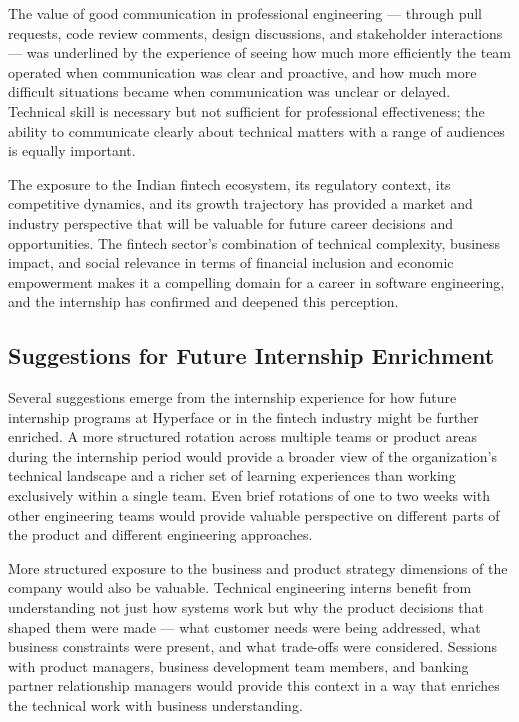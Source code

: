 The value of good communication in professional engineering — through pull requests, code review comments, design discussions, and stakeholder interactions — was underlined by the experience of seeing how much more efficiently the team operated when communication was clear and proactive, and how much more difficult situations became when communication was unclear or delayed. Technical skill is necessary but not sufficient for professional effectiveness; the ability to communicate clearly about technical matters with a range of audiences is equally important.

The exposure to the Indian fintech ecosystem, its regulatory context, its competitive dynamics, and its growth trajectory has provided a market and industry perspective that will be valuable for future career decisions and opportunities. The fintech sector's combination of technical complexity, business impact, and social relevance in terms of financial inclusion and economic empowerment makes it a compelling domain for a career in software engineering, and the internship has confirmed and deepened this perception.

\subsection{Suggestions for Future Internship Enrichment}

Several suggestions emerge from the internship experience for how future internship programs at Hyperface or in the fintech industry might be further enriched. A more structured rotation across multiple teams or product areas during the internship period would provide a broader view of the organization's technical landscape and a richer set of learning experiences than working exclusively within a single team. Even brief rotations of one to two weeks with other engineering teams would provide valuable perspective on different parts of the product and different engineering approaches.

More structured exposure to the business and product strategy dimensions of the company would also be valuable. Technical engineering interns benefit from understanding not just how systems work but why the product decisions that shaped them were made — what customer needs were being addressed, what business constraints were present, and what trade-offs were considered. Sessions with product managers, business development team members, and banking partner relationship managers would provide this context in a way that enriches the technical work with business understanding.

